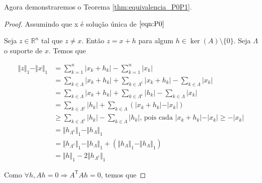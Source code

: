 Agora demonstraremos o Teorema \ref{thm:equivalencia_P0P1}.
\begin{proof}

Assumindo que x é solução única de $\eqref{eqn:P0}$


Seja $z \in \mathbb{R}^n$ tal que $z \neq x$. Então $z = x + h$ para algum $h \in \ker(A) \setminus{ \lbrace 0 \rbrace}$.
Seja $\Lambda$ o suporte de $x$. Temos que

\begin{subequations}
\begin{align*}
\Vert z \Vert_1 - \Vert x \Vert_1 &
= \sum_{k = 1}^n \vert x_k + h_k \vert - \sum_{k = 1}^n \vert x_k \vert \\
& = \sum_{k \in \Lambda} \vert x_k + h_k \vert +
\sum_{k \in \Lambda^{\mathsf{c}}} \vert x_k + h_k \vert
- \sum_{k \in \Lambda} \vert x_k \vert \\
& = \sum_{k \in \Lambda} \vert x_k + h_k \vert +
\sum_{k \in \Lambda^{\mathsf{c}}} \vert h_k \vert
- \sum_{k \in \Lambda} \vert x_k \vert \\
& = \sum_{k \in \Lambda^{\mathsf{c}}} \vert h_k \vert
+ \sum_{k \in \Lambda} \left( \vert x_k + h_k \vert - \vert x_k \vert \right) \\
& \geq \sum_{k \in \Lambda^{\mathsf{c}}} \vert h_k \vert
- \sum_{k \in \Lambda} \vert h_k \vert \text{, pois cada } \vert x_k + h_k \vert - \vert x_k\vert \geq - \vert x_k \vert\\
& = \Vert h_{\Lambda^{\mathsf{c}}} \Vert_1 - \Vert h_\Lambda \Vert_1 \\
& = \Vert h_{\Lambda^{\mathsf{c}}} \Vert_1 - \Vert h_\Lambda \Vert_1 + (\Vert h_\Lambda \Vert_1 - \Vert h_\Lambda \Vert_1) \\
& = \Vert h \Vert_1 - 2 \Vert h_{\Lambda^\mathsf{c}} \Vert_1
\end{align*}
\end{subequations}


Como $\forall h, Ah = 0 \Rightarrow A^{\mathsf{T}} A h = 0$, temos que


\end{proof}
